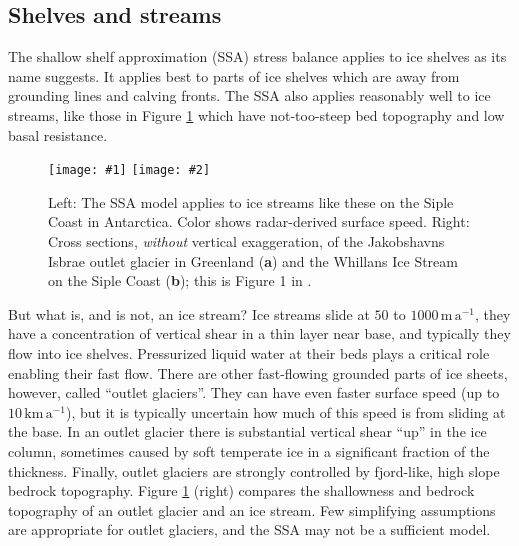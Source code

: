 \documentclass[titlepage,a4paper,final,12pt]{scrartcl}
\newcommand{\twofigsizes}[5]{
\begin{figure}[ht]
\centering
\texttt{[image: \#1]} \quad
\texttt{[image: \#2]}
\caption{#3}
\label{fig:#1}
\end{figure}}
\begin{document}
\subsection{Shelves and streams} \label{sec:shelvesandstreams}

The shallow shelf approximation (SSA) stress balance applies to ice shelves as its name suggests.  It applies best to parts of ice shelves which are away from grounding lines and calving fronts.  The SSA also applies reasonably well to ice streams, like those in Figure \ref{fig:siple} which have not-too-steep bed topography and low basal resistance.

\twofigsizes{siple}{streamisbrae}{Left:  The SSA model applies to ice streams like these on the Siple Coast in Antarctica.  Color shows radar-derived surface speed.  Right: Cross sections, \emph{without} vertical exaggeration, of the Jakobshavns Isbrae outlet glacier in Greenland (\textbf{a}) and the Whillans Ice Stream on the Siple Coast (\textbf{b}); this is Figure 1 in \cite{TrufferEchelmeyer}.}{2.8in}{2.9in}

But what is, and is not, an ice stream?  Ice streams slide at $50$ to $1000 \,\text{m}\,\text{a}^{-1}$, they have a concentration of vertical shear in a thin layer near base, and typically they flow into ice shelves.  Pressurized liquid water at their beds plays a critical role enabling their fast flow.  There are other fast-flowing grounded parts of ice sheets, however, called ``outlet glaciers''.  They can have even faster surface speed (up to $10 \,\text{km}\,\text{a}^{-1}$), but it is typically uncertain how much of this speed is from sliding at the base.  In an outlet glacier there is substantial vertical shear ``up'' in the ice column, sometimes caused by soft temperate ice in a significant fraction of the thickness.  Finally, outlet glaciers are strongly controlled by fjord-like, high slope bedrock topography.  Figure \ref{fig:siple} (right) compares the shallowness and bedrock topography of an outlet glacier and an ice stream.  Few simplifying assumptions are appropriate for outlet glaciers, and the SSA may not be a sufficient model.
\end{document}
